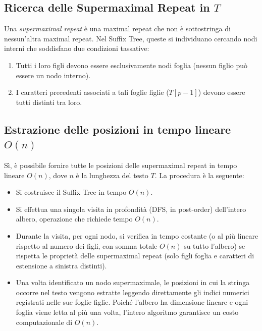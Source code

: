 \documentclass[a4paper,11pt]{article}
\begin{document}
\subsection{Ricerca delle Supermaximal Repeat in $T$}
Una \textit{supermaximal repeat} è una maximal repeat che non è sottostringa di nessun'altra maximal repeat.
Nel Suffix Tree, queste si individuano cercando nodi interni che soddisfano due condizioni tassative:
\begin{enumerate}
    \item Tutti i loro figli devono essere esclusivamente nodi foglia (nessun figlio può essere un nodo interno).
    \item I caratteri precedenti associati a tali foglie figlie ($T[p-1]$) devono essere tutti distinti tra loro.
\end{enumerate}

\subsection{Estrazione delle posizioni in tempo lineare $O(n)$}
Sì, è possibile fornire tutte le posizioni delle supermaximal repeat in tempo lineare $O(n)$, dove $n$ è la lunghezza del testo $T$.
La procedura è la seguente:
\begin{itemize}
    \item Si costruisce il Suffix Tree in tempo $O(n)$.
    \item Si effettua una singola visita in profondità (DFS, in post-order) dell'intero albero, operazione che richiede tempo $O(n)$.
    \item Durante la visita, per ogni nodo, si verifica in tempo costante (o al più lineare rispetto al numero dei figli, con somma totale $O(n)$ su tutto l'albero) se rispetta le proprietà delle supermaximal repeat (solo figli foglia e caratteri di estensione a sinistra distinti).
    \item Una volta identificato un nodo supermaximale, le posizioni in cui la stringa occorre nel testo vengono estratte leggendo direttamente gli indici numerici registrati nelle sue foglie figlie. Poiché l'albero ha dimensione lineare e ogni foglia viene letta al più una volta, l'intero algoritmo garantisce un costo computazionale di $O(n)$.
\end{itemize}
\end{document}
